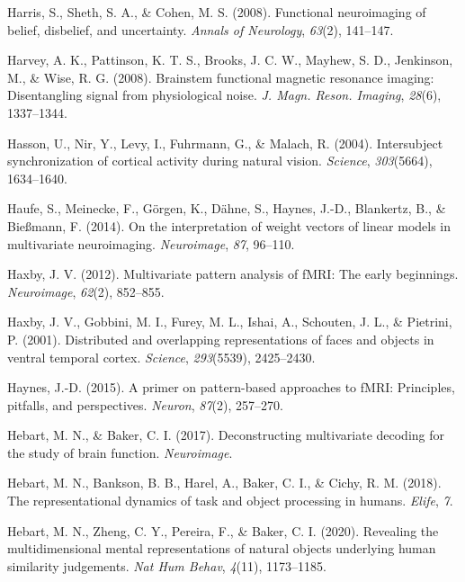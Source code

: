 \documentclass[11pt,american,a4paper,oneside,]{memoir} %
\begin{document}
\leavevmode\hypertarget{ref-harris2008functional}{}%
Harris, S., Sheth, S. A., \& Cohen, M. S. (2008). Functional neuroimaging of belief, disbelief, and uncertainty. \emph{Annals of Neurology}, \emph{63}(2), 141--147.

\leavevmode\hypertarget{ref-Harvey2008-nt}{}%
Harvey, A. K., Pattinson, K. T. S., Brooks, J. C. W., Mayhew, S. D., Jenkinson, M., \& Wise, R. G. (2008). Brainstem functional magnetic resonance imaging: Disentangling signal from physiological noise. \emph{J. Magn. Reson. Imaging}, \emph{28}(6), 1337--1344.

\leavevmode\hypertarget{ref-Hasson2004-xb}{}%
Hasson, U., Nir, Y., Levy, I., Fuhrmann, G., \& Malach, R. (2004). Intersubject synchronization of cortical activity during natural vision. \emph{Science}, \emph{303}(5664), 1634--1640.

\leavevmode\hypertarget{ref-Haufe2014-el}{}%
Haufe, S., Meinecke, F., Görgen, K., Dähne, S., Haynes, J.-D., Blankertz, B., \& Bießmann, F. (2014). On the interpretation of weight vectors of linear models in multivariate neuroimaging. \emph{Neuroimage}, \emph{87}, 96--110.

\leavevmode\hypertarget{ref-Haxby2012-sd}{}%
Haxby, J. V. (2012). Multivariate pattern analysis of fMRI: The early beginnings. \emph{Neuroimage}, \emph{62}(2), 852--855.

\leavevmode\hypertarget{ref-Haxby2001-os}{}%
Haxby, J. V., Gobbini, M. I., Furey, M. L., Ishai, A., Schouten, J. L., \& Pietrini, P. (2001). Distributed and overlapping representations of faces and objects in ventral temporal cortex. \emph{Science}, \emph{293}(5539), 2425--2430.

\leavevmode\hypertarget{ref-haynes2015primer}{}%
Haynes, J.-D. (2015). A primer on pattern-based approaches to fMRI: Principles, pitfalls, and perspectives. \emph{Neuron}, \emph{87}(2), 257--270.

\leavevmode\hypertarget{ref-Hebart2017-jn}{}%
Hebart, M. N., \& Baker, C. I. (2017). Deconstructing multivariate decoding for the study of brain function. \emph{Neuroimage}.

\leavevmode\hypertarget{ref-Hebart2018-dz}{}%
Hebart, M. N., Bankson, B. B., Harel, A., Baker, C. I., \& Cichy, R. M. (2018). The representational dynamics of task and object processing in humans. \emph{Elife}, \emph{7}.

\leavevmode\hypertarget{ref-Hebart2020-wp}{}%
Hebart, M. N., Zheng, C. Y., Pereira, F., \& Baker, C. I. (2020). Revealing the multidimensional mental representations of natural objects underlying human similarity judgements. \emph{Nat Hum Behav}, \emph{4}(11), 1173--1185.
\end{document}
